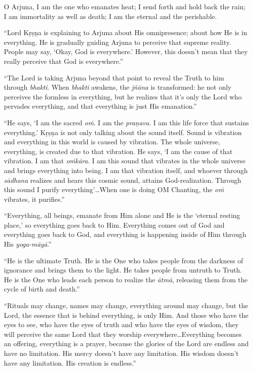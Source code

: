 {O Arjuna, I am the one who emanates heat; I send forth and hold back the rain; I am immortality as well as death; I am the eternal and the perishable.}


\enquote{Lord Kṛṣṇa is explaining to Arjuna about His omnipresence; about how He is in everything. He is gradually guiding Arjuna to perceive that supreme reality. People may say, \enquote{Okay, God is everywhere.} However, this doesn’t mean that they really perceive that God is everywhere.}

\enquote{The Lord is taking Arjuna beyond that point to reveal the Truth to him through \textit{bhakti}. When \textit{bhakti} awakens, the \textit{jñāna} is transformed: he not only perceives the formless in everything, but he realizes that it’s only the Lord who pervades everything, and that everything is just His emanation.}

\enquote{He says, \enquote{I am the sacred \textit{oṁ}. I am the \textit{praṇava}. I am this life force that sustains everything.} Kṛṣṇa is not only talking about the sound itself. Sound is vibration and everything in this world is caused by vibration. The whole universe, everything, is created due to that vibration. He says, \enquote{I am the cause of that vibration. I am that \textit{oṁkāra}. I am this sound that vibrates in the whole universe and brings everything into being. I am that vibration itself, and whoever through \textit{sādhana} realizes and hears this cosmic sound, attains God-realization. Through this sound I purify everything}\ldots When one is doing OM Chanting, the \textit{oṁ} vibrates, it purifies.}

\enquote{Everything, all beings, emanate from Him alone and He is the \enquote{eternal resting place,} so everything goes back to Him. Everything comes out of God and everything goes back to God, and everything is happening inside of Him through His \textit{yoga-māyā}.}

\enquote{He is the ultimate Truth. He is the One who takes people from the darkness of ignorance and brings them to the light. He takes people from untruth to Truth. He is the One who leads each person to realize the \textit{ātmā}, releasing them from the cycle of birth and death.}

\enquote{Rituals may change, names may change, everything around may change, but the Lord, the essence that is behind everything, is only Him. And those who have the eyes to see, who have the eyes of truth and who have the eyes of wisdom, they will perceive the same Lord that they worship everywhere\ldots Everything becomes an offering, everything is a prayer, because the glories of the Lord are endless and have no limitation. His mercy doesn’t have any limitation. His wisdom doesn’t have any limitation. His creation is endless.}

